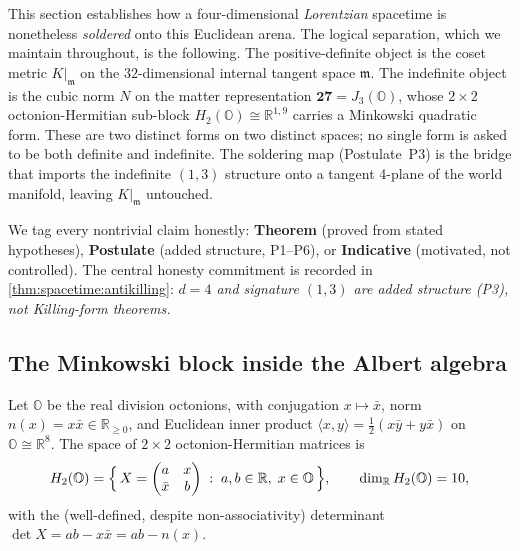 \documentclass[11pt]{article}
\theoremstyle{plain}
\theoremstyle{definition}
\theoremstyle{remark}
\begin{document}
This section establishes how a four-dimensional \emph{Lorentzian} spacetime is
nonetheless \emph{soldered} onto this Euclidean arena. The logical separation, which
we maintain throughout, is the following. The positive-definite object is the coset
metric $K|_{\mathfrak m}$ on the $32$-dimensional internal tangent space $\mathfrak m$.
The indefinite object is the cubic norm $N$ on the matter representation
$\mathbf{27}=J_3(\mathbb O)$, whose $2\times2$ octonion-Hermitian sub-block
$H_2(\mathbb O)\cong\mathbb R^{1,9}$ carries a Minkowski quadratic form. These are
two distinct forms on two distinct spaces; no single form is asked to be both
definite and indefinite. The soldering map (Postulate~P3) is the bridge that imports
the indefinite $(1,3)$ structure onto a tangent 4-plane of the world manifold,
leaving $K|_{\mathfrak m}$ untouched.

We tag every nontrivial claim honestly: \textbf{Theorem} (proved from stated
hypotheses), \textbf{Postulate} (added structure, P1--P6), or
\textbf{Indicative} (motivated, not controlled). The central honesty commitment is
recorded in \autoref{thm:spacetime:antikilling}: \emph{$d=4$ and signature $(1,3)$ are
added structure (P3), not Killing-form theorems.}

\subsection{The Minkowski block inside the Albert algebra}
\label{sec:spacetime:block}

Let $\mathbb O$ be the real division octonions, with conjugation $x\mapsto\bar x$,
norm $n(x)=x\bar x\in\mathbb R_{\ge0}$, and Euclidean inner product
$\langle x,y\rangle=\tfrac12(x\bar y+y\bar x)$ on $\mathbb O\cong\mathbb R^8$. The
space of $2\times2$ octonion-Hermitian matrices is
\begin{equation}\label{eq:spacetime:H2O}
  H_2(\mathbb O)=\Bigl\{\,X=\begin{pmatrix} a & x\\ \bar x & b\end{pmatrix}
  \;:\; a,b\in\mathbb R,\; x\in\mathbb O \,\Bigr\},\qquad
  \dim_{\mathbb R}H_2(\mathbb O)=10,
\end{equation}
with the (well-defined, despite non-associativity) determinant
$\det X = ab - x\bar x = ab - n(x)$.
\end{document}
